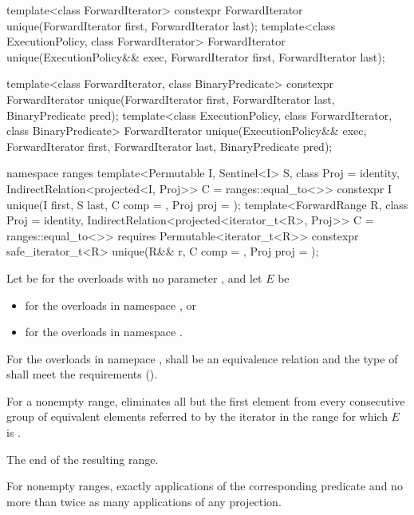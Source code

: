 %
\begin{itemdecl}
template<class ForwardIterator>
  constexpr ForwardIterator unique(ForwardIterator first, ForwardIterator last);
template<class ExecutionPolicy, class ForwardIterator>
  ForwardIterator unique(ExecutionPolicy&& exec,
                         ForwardIterator first, ForwardIterator last);

template<class ForwardIterator, class BinaryPredicate>
  constexpr ForwardIterator unique(ForwardIterator first, ForwardIterator last,
                                   BinaryPredicate pred);
template<class ExecutionPolicy, class ForwardIterator, class BinaryPredicate>
  ForwardIterator unique(ExecutionPolicy&& exec,
                         ForwardIterator first, ForwardIterator last,
                         BinaryPredicate pred);

namespace ranges {
  template<Permutable I, Sentinel<I> S, class Proj = identity,
      IndirectRelation<projected<I, Proj>> C = ranges::equal_to<>>
    constexpr I unique(I first, S last, C comp = {}, Proj proj = {});
  template<ForwardRange R, class Proj = identity,
      IndirectRelation<projected<iterator_t<R>, Proj>> C = ranges::equal_to<>>
    requires Permutable<iterator_t<R>>
    constexpr safe_iterator_t<R>
      unique(R&& r, C comp = {}, Proj proj = {});
}
\end{itemdecl}

\begin{itemdescr}
\pnum
Let  be  for the overloads with no
parameter , and let $E$ be
\begin{itemize}
\item {}
  for the overloads in namespace , or
\item {}
  for the overloads in namespace .
\end{itemize}

\pnum
\requires
For the overloads in namepace ,
 shall be an equivalence relation and
the type of  shall meet the
 requirements ().

\pnum
\effects
For a nonempty range, eliminates all but the first element from every
consecutive group of equivalent elements referred to by the iterator
in the range
for which $E$ is .

\pnum
\returns
The end of the resulting range.

\pnum
\complexity
For nonempty ranges, exactly
applications of the corresponding predicate
and no more than twice as many applications of any projection.
\end{itemdescr}

